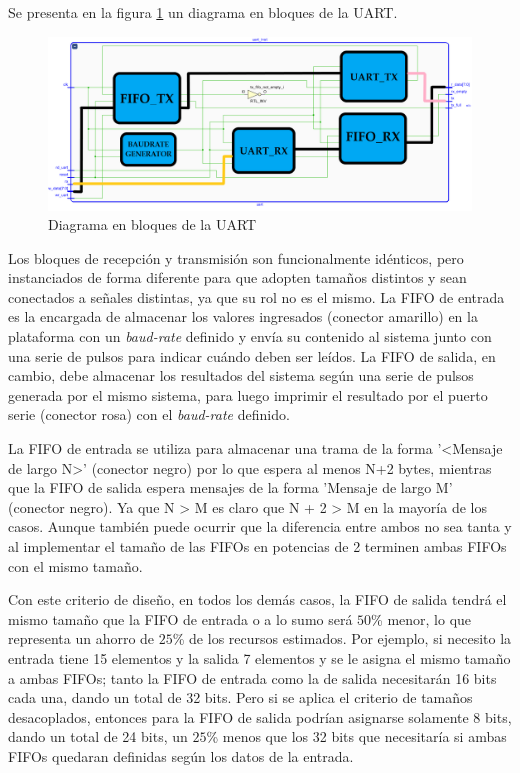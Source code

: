 		Se presenta en la figura \ref{fig:FSMD_UART} un diagrama en bloques de la UART.
			
		\begin{figure}[h]
		\centering
		\includegraphics[scale=.35]{./Figures/UART}
			\caption{Diagrama en bloques de la UART}
			\label{fig:FSMD_UART}
		\end{figure}

		Los bloques de recepción y transmisión son funcionalmente idénticos, pero instanciados de forma diferente para que adopten tamaños distintos y sean conectados a señales distintas, ya que su rol no es el mismo. La FIFO de entrada es la encargada de almacenar los valores ingresados (conector amarillo) en la plataforma con un \textit{baud-rate} definido y envía su contenido al sistema junto con una serie de pulsos para indicar cuándo deben ser leídos. La FIFO de salida, en cambio, debe almacenar los resultados del sistema según una serie de pulsos generada por el mismo sistema, para luego imprimir el resultado por el puerto serie (conector rosa) con el \textit{baud-rate} definido.

		La FIFO de entrada se utiliza para almacenar una trama de la forma '<Mensaje de largo N>' (conector negro) por lo que espera al menos N+2 bytes, mientras que la FIFO de salida espera mensajes de la forma 'Mensaje de largo M' (conector negro). Ya que N > M es claro que N + 2 > M en la mayoría de los casos. Aunque también puede ocurrir que la diferencia entre ambos no sea tanta y al implementar el tamaño de las FIFOs en potencias de 2 terminen ambas FIFOs con el mismo tamaño. 

		Con este criterio de diseño, en todos los demás casos, la FIFO de salida tendrá el mismo tamaño que la FIFO de entrada o a lo sumo será $50$\% menor, lo que representa un ahorro de $25$\% de los recursos estimados. Por ejemplo, si necesito la entrada tiene 15 elementos y la salida 7 elementos y se le asigna el mismo tamaño a ambas FIFOs; tanto la FIFO de entrada como la de salida necesitarán 16 bits cada una, dando un total de 32 bits. Pero si se aplica el criterio de tamaños desacoplados, entonces para la FIFO de salida podrían asignarse solamente 8 bits, dando un total de 24 bits, un $25$\% menos que los 32 bits que necesitaría si ambas FIFOs quedaran definidas según los datos de la entrada.
		
